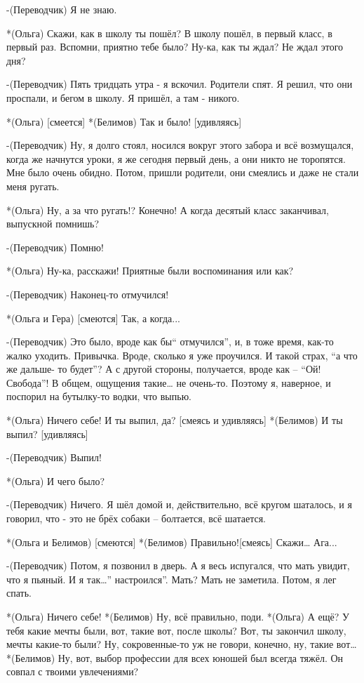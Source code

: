 -(Переводчик) Я не знаю.

*(Ольга) Скажи, как в школу ты пошёл? В школу пошёл, в первый класс, в первый раз. Вспомни, приятно тебе было? Ну-ка, как ты ждал? Не ждал этого дня?

-(Переводчик) Пять тридцать утра - я вскочил. Родители спят. Я решил, что они проспали, и бегом в школу. Я пришёл, а там - никого.

*(Ольга) [смеется]
*(Белимов) Так и было! [удивляясь]

-(Переводчик) Ну, я долго стоял, носился вокруг этого забора и всё возмущался, когда же начнутся уроки, я же сегодня первый день, а они никто не торопятся. Мне было очень обидно. Потом, пришли родители, они смеялись и даже не стали меня ругать.

*(Ольга) Ну, а за что ругать!? Конечно! А когда десятый класс заканчивал, выпускной помнишь?

-(Переводчик) Помню!

*(Ольга) Ну-ка, расскажи! Приятные были воспоминания или как? 

-(Переводчик) Наконец-то отмучился!

*(Ольга и Гера) [смеются] Так, а когда...

-(Переводчик) Это было, вроде как бы“ отмучился”, и, в тоже время, как-то жалко уходить. Привычка. Вроде, сколько я уже проучился. И такой страх, “а что же дальше- то будет”? А с другой стороны, получается, вроде как – “Ой! Свобода”! В общем, ощущения такие… не очень-то. Поэтому я, наверное, и поспорил на бутылку-то водки, что выпью.

*(Ольга) Ничего себе! И ты выпил, да? [смеясь и удивляясь]
*(Белимов) И ты выпил? [удивляясь]

-(Переводчик) Выпил!

*(Ольга) И чего было?

-(Переводчик) Ничего. Я шёл домой и, действительно, всё кругом шаталось, и я говорил, что - это не брёх собаки --  болтается, всё шатается.

*(Ольга и Белимов) [смеются]
*(Белимов) Правильно![смеясь] Скажи… Ага...

-(Переводчик) Потом, я позвонил в дверь. А я весь испугался, что мать увидит, что я пьяный. И я так…” настроился”. Мать? Мать не заметила. Потом, я лег спать.

*(Ольга) Ничего себе!
*(Белимов) Ну, всё правильно, поди.
*(Ольга) А ещё? У тебя какие мечты были, вот, такие вот, после школы? Вот, ты закончил школу, мечты какие-то были? Ну, сокровенные-то уж не говори, конечно, ну, такие вот…
*(Белимов) Ну, вот, выбор профессии для всех юношей был всегда тяжёл. Он совпал с твоими увлечениями?

